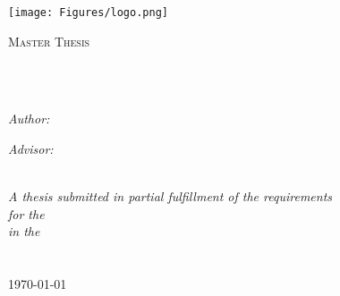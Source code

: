\documentclass[
11pt, %
english, %
singlespacing, %
headsepline, %
]{MastersDoctoralThesis} %
\author{Hadi \textsc{Hariri}} %
\begin{document}
\frontmatter %

\pagestyle{plain} %


\begin{titlepage}
\begin{center}
\texttt{[image: Figures/logo.png]} %

\vspace*{.06\textheight}
{\scshape\LARGE \univname\par}\vspace{1.5cm} %
\textsc{\Large Master Thesis}\\[0.5cm] %

\HRule \\[0.4cm] %
{\huge \bfseries \ttitle\par}\vspace{0.4cm} %
\HRule \\[1.5cm] %
 
\begin{minipage}[t]{0.4\textwidth}
\begin{flushleft} \large
\emph{Author:}\\
{\authorname} %
\end{flushleft}
\end{minipage}
\begin{minipage}[t]{0.4\textwidth}
\begin{flushright} \large
\emph{Advisor:} \\
{\supname} %
\end{flushright}
\end{minipage}\\[3cm]
 
\vfill
\large \textit{A thesis submitted in partial fulfillment of the requirements\\ for the \degreename}\\[0.3cm] %
\textit{in the}\\[0.3cm]
\groupname\\\deptname\\[1.1cm] %
{\large \today }\\[1cm]
\vfill
\end{center}
\end{titlepage}
\end{document}
